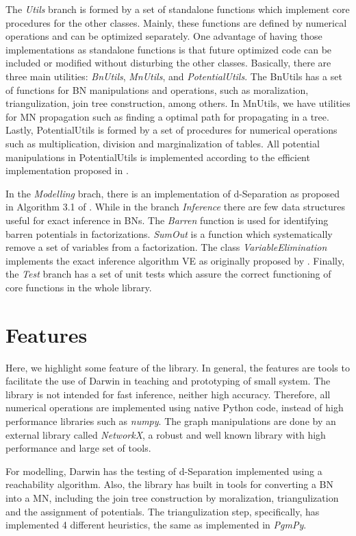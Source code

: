 The \emph{Utils} branch is formed by a set of standalone functions which implement core procedures for the other classes.
Mainly, these functions are defined by numerical operations and can be optimized separately.
One advantage of having those implementations as standalone functions is that future optimized code can be included or modified without disturbing the other classes.
Basically, there are three main utilities: \emph{BnUtils}, \emph{MnUtils}, and \emph{PotentialUtils}.
The BnUtils has a set of functions for BN manipulations and operations, such as moralization, triangulization, join tree construction, among others.
In MnUtils, we have utilities for MN propagation such as finding a optimal path for propagating in a tree.
Lastly, PotentialUtils is formed by a set of procedures for numerical operations such as multiplication, division and marginalization of tables.
All potential manipulations in PotentialUtils is implemented according to the efficient implementation proposed in \cite{koll09}.

In the \emph{Modelling} brach, there is an implementation of d-Separation as proposed in Algorithm 3.1 of \cite{koll09}.
While in the branch \emph{Inference} there are few data structures useful for exact inference in BNs.
The \emph{Barren} function is used for identifying barren potentials in factorizations.
\emph{SumOut} is a function which systematically remove a set of variables from a factorization.
The class \emph{VariableElimination} implements the exact inference algorithm VE as originally proposed by \cite{zhan94}.
Finally, the \emph{Test} branch has a set of unit tests which assure the correct functioning of core functions in the whole library.

\section{Features}
\label{sec:system:sec2}

Here, we highlight some feature of the library.
In general, the features are tools to facilitate the use of Darwin in teaching and prototyping of small system.
The library is not intended for fast inference, neither high accuracy.
Therefore, all numerical operations are implemented using native Python code, instead of high performance libraries such as \emph{numpy}.
The graph manipulations are done by an external library called \emph{NetworkX}, a robust and well known library with high performance and large set of tools.

For modelling, Darwin has the testing of d-Separation implemented using a reachability algorithm.
Also, the library has built in tools for converting a BN into a MN, including the join tree construction by moralization, triangulization and the assignment of potentials.
The triangulization step, specifically, has implemented 4 different heuristics, the same as implemented in \emph{PgmPy}.

